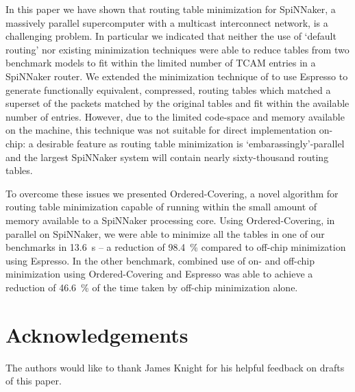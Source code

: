 \documentclass[conference]{IEEEtran}
\begin{document}
  In this paper we have shown that routing table minimization for SpiNNaker, a massively parallel supercomputer with a multicast interconnect network, is a challenging problem.
  In particular we indicated that neither the use of `default routing' nor existing minimization techniques were able to reduce tables from two benchmark models to fit within the limited number of TCAM entries in a SpiNNaker router.
  We extended the minimization technique of \textcite{Liu2002} to use Espresso to generate functionally equivalent, compressed, routing tables which matched a superset of the packets matched by the original tables and fit within the available number of entries.
  However, due to the limited code-space and memory available on the machine, this technique was not suitable for direct implementation on-chip: a desirable feature as routing table minimization is `embarassingly'-parallel and the largest SpiNNaker system will contain nearly sixty-thousand routing tables.

  To overcome these issues we presented Ordered-Covering, a novel algorithm for routing table minimization capable of running within the small amount of memory available to a SpiNNaker processing core.
  Using Ordered-Covering, in parallel on SpiNNaker, we were able to minimize all the tables in one of our benchmarks in \SI{13.6}{\second} -- a reduction of \SI{98.4}{\percent} compared to off-chip minimization using Espresso.
  In the other benchmark, combined use of on- and off-chip minimization using Ordered-Covering and Espresso was able to achieve a reduction of \SI{46.6}{\percent} of the time taken by off-chip minimization alone.

  \section*{Acknowledgements}

  The authors would like to thank James Knight for his helpful feedback on drafts of this paper.

\printbibliography
\end{document}
